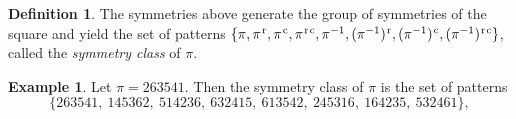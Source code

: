\documentclass[
final
]{dmtcs-episciences}
\theoremstyle{definition}
\newtheorem{definition}[theorem]{Definition}
\newtheorem{example}[theorem]{Example}
\theoremstyle{remark}
\begin{document}
\begin{definition}

The symmetries above generate the group of symmetries of the square and yield the set of patterns
$\{ 
\pi, 
\pi^\text{\hspace{0.01in}r}, 
\pi^\text{\hspace{0.01in}c}, 
\pi^\text{\hspace{0.01in}r\hspace{0.01in}c}, 
\pi^{-1},
(\pi^{-1})^\text{\hspace{0.01in}r}, 
(\pi^{-1})^\text{\hspace{0.01in}c}, 
(\pi^{-1})^\text{\hspace{0.01in}r\hspace{0.01in}c}
\}$,
called the \emph{symmetry class} of $\pi$.

\end{definition}


\begin{example}

%

Let $\pi = 263541$.  Then the symmetry class of $\pi$ is the set of patterns
\[
\{263541,\ 145362,\ 514236,\ 632415,\ 613542,\ 245316,\ 164235,\ 532461\},
\]
\end{example}
\end{document}
